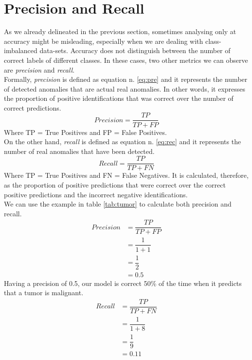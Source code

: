 \section{Precision and Recall}
As we already delineated in the previous section, sometimes analysing only at accuracy might be misleading, especially when we are dealing with class-imbalanced data-sets. Accuracy does not distinguish between the number of correct labels of different classes.  \cite{metrics} In these cases, two other metrics we can observe are \textit{precision} and \textit{recall}. \\
Formally, \textit{precision} is defined as equation n. \ref{eq:pre} and it represents the number of detected anomalies that are actual real anomalies. \cite{tatbul2019precision}
In other words, it expresses the proportion of positive identifications that was correct over the number of correct predictions. 
\begin{equation}
Precision = \dfrac{TP}{TP+FP}
\label{eq:pre}    
\end{equation}
Where TP = True Positives and FP = False Positives. \\
On the other hand, \textit{recall} is defined as equation n. \ref{eq:rec} and it represents the number of real anomalies that have been detected.\cite{tatbul2019precision}
\begin{equation}
Recall = \dfrac{TP}{TP+FN}
\label{eq:rec}    
\end{equation}
Where TP = True Positives and FN = False Negatives. It is calculated, therefore, as the proportion of positive predictions that were correct over the correct positive predictions and the incorrect negative identifications.  \\
We can use the example in table \ref{tab:tumor} to calculate both precision and recall. 
\begin{equation}
\begin{aligned}
Precision &= \dfrac{TP}{TP+FP}\\
          &= \dfrac{1}{1+1}\\
          &= \dfrac{1}{2}\\
          &= 0.5
\end{aligned}
\label{eq:pre_ex}    
\end{equation}
Having a precision of 0.5, our model is correct 50\% of the time when it predicts that a tumor is malignant. 
\begin{equation}
\begin{aligned}
Recall &= \dfrac{TP}{TP+FN}\\
          &= \dfrac{1}{1+8}\\
          &= \dfrac{1}{9}\\
          &= 0.11
\end{aligned}
\label{eq:rec2}    
\end{equation}
